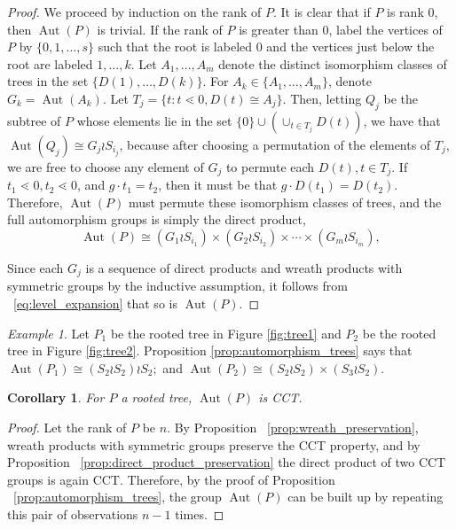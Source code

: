\documentclass[smallextended, envcountsame, numbook]{svjour3}
\theoremstyle{plain}
\newtheorem{cor}[thm]{Corollary}
\theoremstyle{definition}
\theoremstyle{remark}
\newtheorem{eg}[thm]{Example}
\numberwithin{equation}{section}
\newcommand\Aut{\operatorname{Aut}}
\begin{document}
\begin{proof}
We proceed by induction on the rank of $P$.  It is clear that if $P$ is rank 0, then $\Aut(P)$ is trivial.  If the rank of $P$ is greater than 0, label the vertices of $P$ by $\{0,1,\ldots, s\}$ such that the root is labeled $0$ and the vertices just below the root are labeled $1, \ldots, k$. Let $A_1,\ldots, A_m$ denote the distinct isomorphism classes of trees in the set $\{D(1),\ldots, D(k)\}$. For $A_k \in \{A_1,\ldots,A_m\}$, denote $G_k = \Aut(A_k)$. 
Let $T_j = \{t\colon t\lessdot 0,D(t) \cong A_j\}$. Then, letting $Q_j$ be the subtree of $P$ whose elements lie in the set $\{0\} \cup (\cup_{t \in T_j} D(t))$, we have that $\Aut(Q_j) \cong G_j \wr S_{i_j}$, because after choosing a permutation of the elements of $T_j$, we are free to choose any element of $G_j$ to permute each $D(t),t \in T_j$. If $t_1 \lessdot 0,t_2 \lessdot 0$, and $g \cdot t_1 = t_2$, then it must be that $g \cdot D(t_1) = D(t_2)$. Therefore, $\Aut(P)$ must permute these isomorphism classes of trees, and the full automorphism groups is simply the direct product, 
\begin{equation}
\Aut(P) \cong (G_1 \wr S_{i_1}) \times (G_2 \wr S_{i_2}) \times \cdots \times (G_m\wr S_{i_m}),
\end{equation}

Since each $G_j$ is a sequence of direct products and wreath products with symmetric groups by the inductive assumption, it follows from ~\eqref{eq:level_expansion} that so is $\Aut(P)$.
\end{proof}

\begin{eg}
Let $P_1$ be the rooted tree in Figure \ref{fig:tree1} and $P_2$ be the rooted tree in Figure \ref{fig:tree2}.  Proposition \ref{prop:automorphism_trees} says that $\Aut (P_1) \cong (S_2 \wr S_2)\wr S_2;$ and $\Aut(P_2) \cong (S_2 \wr S_2) \times (S_3 \wr S_2) $. 
\end{eg}

\begin{cor}
\label{cor:tree_cct}
For $P$ a rooted tree, $\Aut(P)$ is CCT.
\end{cor}
\begin{proof}
Let the rank of $P$ be $n$. By Proposition ~\ref{prop:wreath_preservation}, wreath products with symmetric groups preserve the CCT property, and by Proposition ~\ref{prop:direct_product_preservation} the direct product of two CCT groups is again CCT. Therefore, by the proof of Proposition ~\ref{prop:automorphism_trees}, the group $\Aut(P)$ can be built up by repeating this pair of observations $n-1$ times.
\end{proof}
\end{document}
